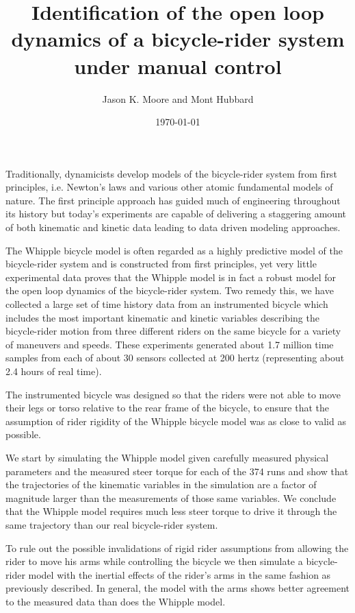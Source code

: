 \documentclass{article}
\title{Identification of the open loop dynamics of a bicycle-rider system
under manual control}
\author{Jason K. Moore and Mont Hubbard}
\date{\today}
\begin{document}
\maketitle

Traditionally, dynamicists develop models of the bicycle-rider system from
first principles, i.e. Newton's laws and various other atomic fundamental
models of nature. The first principle approach has guided much of engineering
throughout its history but today's experiments are capable of delivering a
staggering amount of both kinematic and kinetic data leading to data driven
modeling approaches.

The Whipple bicycle model is often regarded as a highly predictive model of the
bicycle-rider system and is constructed from first principles, yet very little
experimental data proves that the Whipple model is in fact a robust model for
the open loop dynamics of the bicycle-rider system. Two remedy this, we have
collected a large set of time history data from an instrumented bicycle which
includes the most important kinematic and kinetic variables describing the
bicycle-rider motion from three different riders on the same bicycle for a
variety of maneuvers and speeds. These experiments generated about 1.7 million
time samples from each of about 30 sensors collected at 200 hertz (representing
about 2.4 hours of real time).

The instrumented bicycle was designed so that the riders were not able to move
their legs or torso relative to the rear frame of the bicycle, to ensure that
the assumption of rider rigidity of the Whipple bicycle model was as close to
valid as possible.

We start by simulating the Whipple model given carefully measured physical
parameters and the measured steer torque for each of the 374 runs and show that
the trajectories of the kinematic variables in the simulation are a factor of
magnitude larger than the measurements of those same variables. We conclude
that the Whipple model requires much less steer torque to drive it through the
same trajectory than our real bicycle-rider system.

To rule out the possible invalidations of rigid rider assumptions from allowing
the rider to move his arms while controlling the bicycle we then simulate a
bicycle-rider model with the inertial effects of the rider's arms in the same
fashion as previously described. In general, the model with the arms shows
better agreement to the measured data than does the Whipple model.
\end{document}
